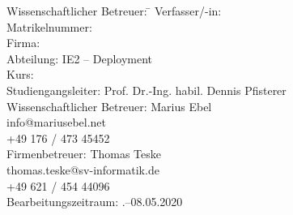 \begin{titlepage}
\begin{center}
\begin{minipage}{\textwidth}
\begin{tabbing}
	Wissenschaftlicher Betreuer: \hspace{0.85cm}\=\kill
	Verfasser/-in: \> \DerAutorDerArbeit \\[1.5mm]
	Matrikelnummer:  \\[1.5mm]
	Firma: \> \DerNameDerFirma  \\[1.5mm]
	Abteilung: \> IE2 -- Deployment \\[1.5mm]
	Kurs: \> \DieKursbezeichnung \\[1.5mm]
	Studiengangsleiter: \> Prof. Dr.-Ing. habil. Dennis Pfisterer \\[1.5mm]
	Wissenschaftlicher Betreuer: \> Marius Ebel \\
	\> info@mariusebel.net \\
	\> +49 176 / 473 45452 \\[1.5mm]
	Firmenbetreuer: \> Thomas Teske \\
	\> thomas.teske@sv-informatik.de \\
	\> +49 621 / 454 44096 \\[1.5mm]
	Bearbeitungszeitraum: .--08.05.2020
\end{tabbing}
\end{minipage}

\end{center}

\end{titlepage}